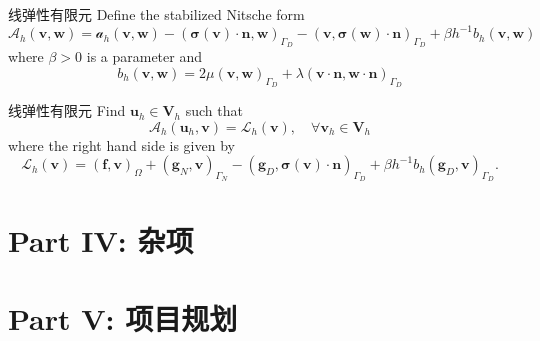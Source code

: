 \documentclass[lang=en,aspectratio=43,theme=default,logo=on]{simplebeamer}
\begin{document}
\begin{frame}{线弹性有限元}
    Define the stabilized Nitsche form
    \begin{equation*}
        \mathcal{A}_h(\mathbf{v},\mathbf{w})=\mathcal{a}_h(\mathbf{v},\mathbf{w})-\left(\boldsymbol{\sigma}(\mathbf{v})\cdot\mathbf{n}, \mathbf{w} \right)_{\Gamma_D} - \left(\mathbf{v}, \boldsymbol{\sigma}(\mathbf{w})\cdot\mathbf{n}\right)_{\Gamma_D} + \beta h^{-1}b_h(\mathbf{v},\mathbf{w})
    \end{equation*}
    where $\beta > 0$ is a parameter and
    \begin{equation*}
        b_h(\mathbf{v}, \mathbf{w})=2\mu\left(  \mathbf{v}, \mathbf{w} \right)_{\Gamma_D} + \lambda\left( \mathbf{v} \cdot \mathbf{n}, \mathbf{w} \cdot \mathbf{n} \right)_{\Gamma_D}
    \end{equation*}

\end{frame}

\begin{frame}{线弹性有限元}
    Find $\mathbf{u}_h \in \mathbf{V}_h$ such that
    \begin{equation*}
        \mathcal{A}_h(\mathbf{u}_h, \mathbf{v})=\mathcal{L}_h(\mathbf{v}), \quad \forall\mathbf{v}_h \in \mathbf{V}_h
    \end{equation*}
    where the right hand side is given by
    \begin{equation*}
        \mathcal{L}_h(\mathbf{v})=\left( \mathbf{f} , \mathbf{v}\right)_\Omega + \left( \mathbf{g}_N , \mathbf{v}\right)_{\Gamma_N} - \left( \mathbf{g}_D, \boldsymbol{\sigma}(\mathbf{v}) \cdot \mathbf{n} \right)_{\Gamma_D} + \beta h^{-1}b_h\left(\mathbf{g}_D, \mathbf{v}  \right)_{\Gamma_D}.
    \end{equation*}
\end{frame}

\section{Part IV: 杂项}
\section{Part V: 项目规划}
\end{document}

